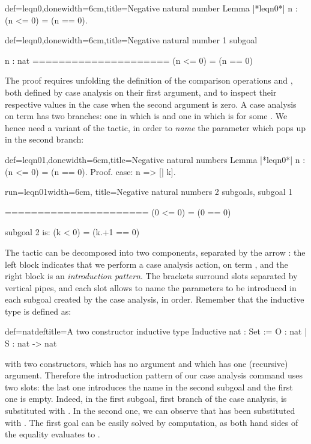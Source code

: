\begin{coq}{def=leqn0,done}{width=6cm,title=Negative natural number}
Lemma |*leqn0*| n : (n <= 0) = (n == 0).
\end{coq}
\begin{coqout}{def=leqn0,done}{width=6cm,title=Negative natural
    number}
1 subgoal

n : nat
=====================
  (n <= 0) = (n == 0)
\end{coqout}

The proof requires unfolding the definition of the comparison operations
\C{<=} and \C{==}, both defined by case analysis on their first
argument, and to inspect their respective values in the case when the
second argument is zero. A case analysis on term  has two
branches: one in which  is  and one in which  is
 for some . We hence need a variant of the 
tactic, in order to \emph{name} the parameter  which pops up in
the second branch:
\begin{coq}{def=leqn01,done}{width=6cm,title=Negative natural numbers}
Lemma |*leqn0*| n : (n <= 0) = (n == 0).
Proof.
case: n => [| k].
\end{coq}
\begin{coqout}{run=leqn01}{width=6cm, title=Negative natural numbers}
2 subgoals, subgoal 1

======================
  (0 <= 0) = (0 == 0)

subgoal 2 is:
 (k < 0) = (k.+1 == 0)
\end{coqout}
The tactic   can be decomposed into two components,
separated by the arrow \C{=>}: the left block  indicates
that we  perform a case analysis action, on term , and the right
block \C{[|k]} is an \emph{introduction pattern}. The brackets
surround slots separated by vertical pipes, and each slot allows to
name the parameters to be introduced in each subgoal created by the
case analysis, in order. Remember that the inductive type  is
defined as:

\begin{coq}{def=natdef}{title=A two constructor inductive type}
Inductive nat : Set :=  O : nat | S : nat -> nat
\end{coq}
with two constructors,  which has no argument and  which has
one (recursive) argument. Therefore the introduction pattern \C{[|k]}
of our case analysis command uses two slots: the last one introduces
the name  in the second subgoal and the first one is
empty. Indeed, in the first subgoal, first branch of the case
analysis,  is substituted with . In the second one, we can
observe that  has been substituted with . The first goal
can be easily solved by computation, as both hand sides of the equality
evaluates to .

